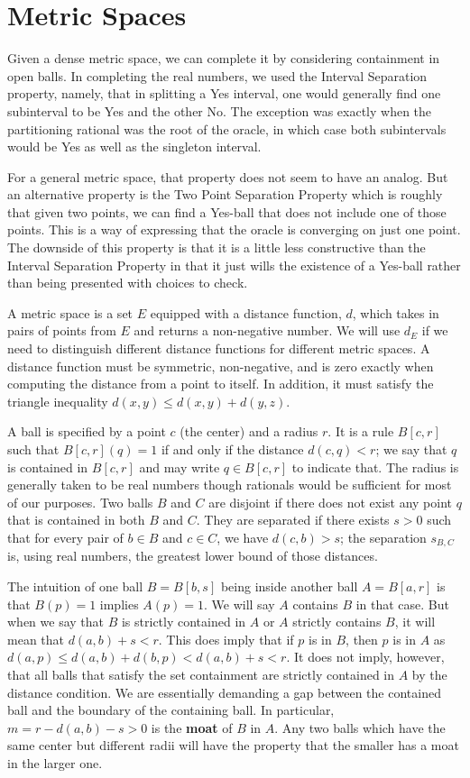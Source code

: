 \documentclass[12pt]{article}
\begin{document}
\section{Metric Spaces}

Given a dense metric space, we can complete it by considering containment in open balls. In completing the real numbers, we used the Interval Separation property, namely, that in splitting a Yes interval, one would generally find one subinterval to be Yes and the other No. The exception was exactly when the partitioning rational was the root of the oracle, in which case both subintervals would be Yes as well as the singleton interval. 

For a general metric space, that property does not seem to have an analog. But an alternative property is the Two Point Separation Property which is roughly that given two points, we can find a Yes-ball that does not include one of those points. This is a way of expressing that the oracle is converging on just one point. The downside of this property is that it is a little less constructive than the Interval Separation Property in that it just wills the existence of a Yes-ball rather than being presented with choices to check.

A metric space is a set $E$ equipped with a distance function, $d$, which takes in pairs of points from $E$ and returns a non-negative number. We will use $d_E$ if we need to distinguish different distance functions for different metric spaces. A distance function must be symmetric, non-negative, and is zero exactly when computing the distance from a point to itself. In addition, it must satisfy the triangle inequality $d(x,y) \leq d(x,y) + d(y,z)$. 

A ball is specified by a point $c$ (the center) and a radius $r$. It is a rule $B[c,r]$ such that $B[c,r](q) = 1$ if and only if the distance $d(c,q) < r$; we say that $q$ is contained in $B[c,r]$ and may write $q \in B[c,r]$ to indicate that. The radius is generally taken to be real numbers though rationals would be sufficient for most of our purposes.  Two balls $B$ and $C$ are disjoint if there does not exist any point $q$ that is contained in both $B$ and $C$. They are separated if there exists $s> 0$ such that for every pair of $b \in B$ and $c \in C$, we have $d(c,b) > s$; the separation $s_{B,C}$ is, using real numbers, the greatest lower bound of those distances.

The intuition of one ball $B= B[b,s]$ being inside another ball $A= B[a, r]$ is that  $B(p) = 1$ implies $A(p) = 1$. We will say $A$ contains $B$ in that case. But when we say that $B$ is strictly contained in $A$ or $A$ strictly contains $B$, it will mean that $d(a,b) + s < r$. This does imply that if $p$ is in $B$, then $p$ is in $A$ as $d(a, p) \leq d(a, b) + d(b, p) < d(a,b) + s < r$. It does not imply, however, that all balls that satisfy the set containment are strictly contained in $A$ by the distance condition. We are essentially demanding a gap between the contained ball and the boundary of the containing ball. In particular, $m = r - d(a,b) - s > 0$ is the \textbf{moat} of $B$ in $A$. Any two balls which have the same center but different radii will have the property that the smaller has a moat in the larger one. 
\end{document}

